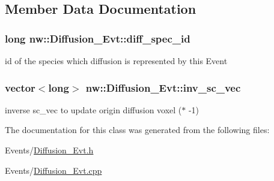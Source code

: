 \subsection{Member Data Documentation}
\hypertarget{classnw_1_1_diffusion___evt_a7193335899a1d41a902dff91fc0029dd}{
\subsubsection[{diff\+\_\+spec\+\_\+id}]{\setlength{\rightskip}{0pt plus 5cm}long nw\+::\+Diffusion\+\_\+\+Evt\+::diff\+\_\+spec\+\_\+id\hspace{0.3cm}{\ttfamily [protected]}}}\label{classnw_1_1_diffusion___evt_a7193335899a1d41a902dff91fc0029dd}


id of the species which diffusion is represented by this Event 

\hypertarget{classnw_1_1_diffusion___evt_ab975d8f0ae97844b4d43222e94871707}{
\subsubsection[{inv\+\_\+sc\+\_\+vec}]{\setlength{\rightskip}{0pt plus 5cm}vector$<$long$>$ nw\+::\+Diffusion\+\_\+\+Evt\+::inv\+\_\+sc\+\_\+vec\hspace{0.3cm}{\ttfamily [protected]}}}\label{classnw_1_1_diffusion___evt_ab975d8f0ae97844b4d43222e94871707}


inverse sc\+\_\+vec to update origin diffusion voxel ($\ast$ -\/1) 



The documentation for this class was generated from the following files\+:\begin{DoxyCompactItemize}
\item 
Events/\hyperlink{_diffusion___evt_8h}{Diffusion\+\_\+\+Evt.\+h}\item 
Events/\hyperlink{_diffusion___evt_8cpp}{Diffusion\+\_\+\+Evt.\+cpp}\end{DoxyCompactItemize}

